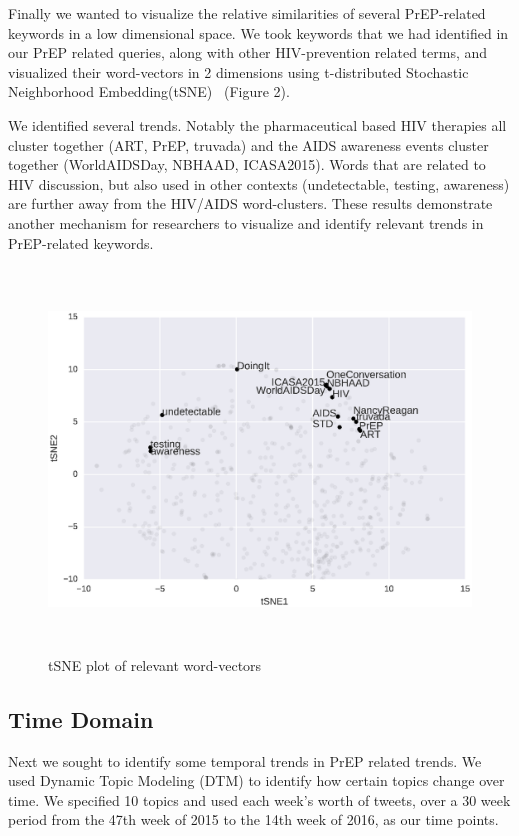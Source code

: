 \documentclass{sig-alternate-05-2015}
\begin{document}
Finally we wanted to visualize the relative similarities of several PrEP-related keywords in a low dimensional space. We took keywords that we had identified in our PrEP related queries, along with other HIV-prevention related terms, and visualized their word-vectors in 2 dimensions using t-distributed Stochastic Neighborhood Embedding(tSNE)~\cite{van2008visualizing} (Figure 2).

We identified several trends. Notably the pharmaceutical based HIV therapies all cluster together (ART, PrEP, truvada) and the AIDS awareness events cluster together (WorldAIDSDay, NBHAAD, ICASA2015). Words that are related to HIV discussion, but also used in other contexts (undetectable, testing, awareness) are further away from the HIV/AIDS word-clusters. These results demonstrate another mechanism for researchers to visualize and identify relevant trends in PrEP-related keywords.

\begin{figure}
\centering
\includegraphics[height=4in, width=6in]{tSNE_word}
\caption{tSNE plot of relevant word-vectors}
\end{figure}

\subsection{Time Domain}

Next we sought to identify some temporal trends in PrEP related trends. We used Dynamic Topic Modeling (DTM) to identify how certain topics change over time. We specified 10 topics and used each week's worth of tweets, over a 30 week period from the 47th week of 2015 to the 14th week of 2016, as our time points.
\end{document}
